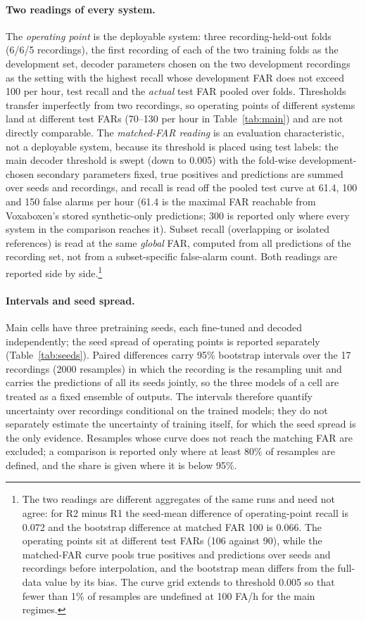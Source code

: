\documentclass[10pt,twocolumn]{article}
\begin{document}
\paragraph{Two readings of every system.} The \emph{operating point} is the deployable system: three recording-held-out folds (6/6/5 recordings), the first recording of each of the two training folds as the development set, decoder parameters chosen on the two development recordings as the setting with the highest recall whose development FAR does not exceed 100 per hour, test recall and the \emph{actual} test FAR pooled over folds. Thresholds transfer imperfectly from two recordings, so operating points of different systems land at different test FARs (70--130 per hour in Table~\ref{tab:main}) and are not directly comparable. The \emph{matched-FAR reading} is an evaluation characteristic, not a deployable system, because its threshold is placed using test labels: the main decoder threshold is swept (down to 0.005) with the fold-wise development-chosen secondary parameters fixed, true positives and predictions are summed over seeds and recordings, and recall is read off the pooled test curve at 61.4, 100 and 150 false alarms per hour (61.4 is the maximal FAR reachable from Voxaboxen's stored synthetic-only predictions; 300 is reported only where every system in the comparison reaches it). Subset recall (overlapping or isolated references) is read at the same \emph{global} FAR, computed from all predictions of the recording set, not from a subset-specific false-alarm count. Both readings are reported side by side.\footnote{The two readings are different aggregates of the same runs and need not agree: for R2 minus R1 the seed-mean difference of operating-point recall is 0.072 and the bootstrap difference at matched FAR 100 is 0.066. The operating points sit at different test FARs (106 against 90), while the matched-FAR curve pools true positives and predictions over seeds and recordings before interpolation, and the bootstrap mean differs from the full-data value by its bias. The curve grid extends to threshold 0.005 so that fewer than 1\% of resamples are undefined at 100 FA/h for the main regimes.}
\paragraph{Intervals and seed spread.} Main cells have three pretraining seeds, each fine-tuned and decoded independently; the seed spread of operating points is reported separately (Table~\ref{tab:seeds}). Paired differences carry 95\% bootstrap intervals over the 17 recordings (2000 resamples) in which the recording is the resampling unit and carries the predictions of all its seeds jointly, so the three models of a cell are treated as a fixed ensemble of outputs. The intervals therefore quantify uncertainty over recordings conditional on the trained models; they do not separately estimate the uncertainty of training itself, for which the seed spread is the only evidence. Resamples whose curve does not reach the matching FAR are excluded; a comparison is reported only where at least 80\% of resamples are defined, and the share is given where it is below 95\%.
\end{document}
